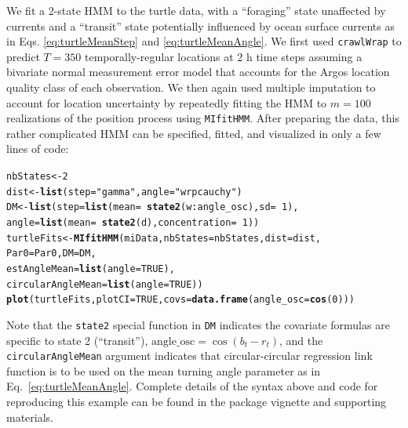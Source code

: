 \documentclass[12pt]{article}\usepackage[]{graphicx}\usepackage[]{color}
\makeatletter
\newcommand{\hlnum}[1]{\textcolor[rgb]{0.686,0.059,0.569}{#1}}%
\newcommand{\hlstr}[1]{\textcolor[rgb]{0.192,0.494,0.8}{#1}}%
\newcommand{\hlopt}[1]{\textcolor[rgb]{0,0,0}{#1}}%
\newcommand{\hlstd}[1]{\textcolor[rgb]{0.345,0.345,0.345}{#1}}%
\newcommand{\hlkwb}[1]{\textcolor[rgb]{0.69,0.353,0.396}{#1}}%
\newcommand{\hlkwc}[1]{\textcolor[rgb]{0.333,0.667,0.333}{#1}}%
\newcommand{\hlkwd}[1]{\textcolor[rgb]{0.737,0.353,0.396}{\textbf{#1}}}%
\newenvironment{kframe}{%
 \def\at@end@of@kframe{}%
 \ifinner\ifhmode%
  \def\at@end@of@kframe{\end{minipage}}%
  \begin{minipage}{\columnwidth}%
 \fi\fi%
 \def\FrameCommand##1{\hskip\@totalleftmargin \hskip-\fboxsep
 \colorbox{shadecolor}{##1}\hskip-\fboxsep
     \hskip-\linewidth \hskip-\@totalleftmargin \hskip\columnwidth}%
 \MakeFramed {\advance\hsize-\width
   \@totalleftmargin\z@ \linewidth\hsize
   \@setminipage}}%
 {\par\unskip\endMakeFramed%
 \at@end@of@kframe}
\newenvironment{knitrout}{}{} %
\makeatother
\begin{document}
We fit a 2-state HMM to the turtle data, with a ``foraging'' state unaffected by currents and a ``transit'' state potentially influenced by ocean surface currents as in Eqs. \ref{eq:turtleMeanStep} and \ref{eq:turtleMeanAngle}.  We first used \verb|crawlWrap| to predict $T=350$ temporally-regular locations at 2 h time steps assuming a bivariate normal measurement error model that accounts for the Argos location quality class of each observation. We then again used multiple imputation to account for location uncertainty by repeatedly fitting the HMM to $m=100$ realizations of the position process using \verb|MIfitHMM|. After preparing the data, this rather complicated HMM can be specified, fitted, and visualized in only a few lines of code:
\begin{knitrout}
\color{fgcolor}\begin{kframe}
\begin{alltt}
\hlstd{nbStates} \hlkwb{<-} \hlnum{2}
\hlstd{dist} \hlkwb{<-} \hlkwd{list}\hlstd{(}\hlkwc{step} \hlstd{=} \hlstr{"gamma"}\hlstd{,} \hlkwc{angle} \hlstd{=} \hlstr{"wrpcauchy"}\hlstd{)}
\hlstd{DM} \hlkwb{<-} \hlkwd{list}\hlstd{(}\hlkwc{step} \hlstd{=} \hlkwd{list}\hlstd{(}\hlkwc{mean} \hlstd{=} \hlopt{~}\hlkwd{state2}\hlstd{(w}\hlopt{:}\hlstd{angle_osc),} \hlkwc{sd} \hlstd{=} \hlopt{~}\hlnum{1}\hlstd{),}
           \hlkwc{angle} \hlstd{=} \hlkwd{list}\hlstd{(}\hlkwc{mean} \hlstd{=} \hlopt{~}\hlkwd{state2}\hlstd{(d),} \hlkwc{concentration}\hlstd{=} \hlopt{~}\hlnum{1}\hlstd{))}
\hlstd{turtleFits} \hlkwb{<-} \hlkwd{MIfitHMM}\hlstd{(miData,} \hlkwc{nbStates} \hlstd{= nbStates,} \hlkwc{dist} \hlstd{= dist,}
                       \hlkwc{Par0} \hlstd{= Par0,} \hlkwc{DM} \hlstd{= DM,}
                       \hlkwc{estAngleMean} \hlstd{=} \hlkwd{list}\hlstd{(}\hlkwc{angle} \hlstd{=} \hlnum{TRUE}\hlstd{),}
                       \hlkwc{circularAngleMean} \hlstd{=} \hlkwd{list}\hlstd{(}\hlkwc{angle} \hlstd{=} \hlnum{TRUE}\hlstd{))}
\hlkwd{plot}\hlstd{(turtleFits,} \hlkwc{plotCI} \hlstd{=} \hlnum{TRUE}\hlstd{,} \hlkwc{covs} \hlstd{=} \hlkwd{data.frame}\hlstd{(}\hlkwc{angle_osc} \hlstd{=} \hlkwd{cos}\hlstd{(}\hlnum{0}\hlstd{)))}
\end{alltt}
\end{kframe}
\end{knitrout}
\noindent Note that the \verb|state2| special function in \verb|DM| indicates the covariate formulas are specific to state 2 (``transit''), $\text{angle\_osc} = \cos(b_t-r_t)$, and the \verb|circularAngleMean| argument indicates that circular-circular regression link function is to be used on the mean turning angle parameter as in Eq.\ \ref{eq:turtleMeanAngle}. Complete details of the syntax above and code for reproducing this example can be found in the package vignette and supporting materials.
\end{document}

